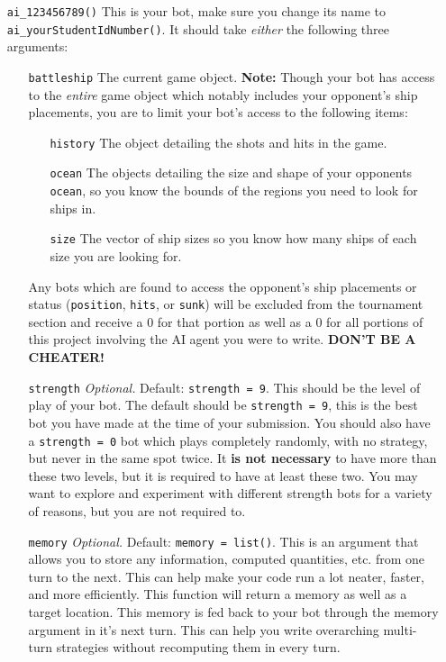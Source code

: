 \documentclass[
]{article}
\begin{document}
\begin{itemize}
\item[\texttt{ai\_123456789()}] This is your bot, make sure you change its name to \texttt{ai\_yourStudentIdNumber()}. It should take \emph{either} the following three arguments:
  \begin{itemize}
      \item[\texttt{battleship}] The current game object. \textbf{Note:} Though your bot has access to the \emph{entire} game object which notably includes your opponent's ship placements, you are to limit your bot's access to the following items:
      \begin{itemize}
        \item[\texttt{history}] The object detailing the shots and hits in the game.
        \item[\texttt{ocean}] The objects detailing the size and shape of your opponents \texttt{ocean}, so you know the bounds of the regions you need to look for ships in.
        \item[\texttt{size}] The vector of ship sizes so you know how many ships of each size you are looking for.
      \end{itemize}
      Any bots which are found to access the opponent's ship placements or status (\texttt{position}, \texttt{hits}, or \texttt{sunk})  will be excluded from the tournament section and receive a \(0\) for that portion as well as a \(0\) for all portions of this project involving the AI agent you were to write. \textbf{DON'T BE A CHEATER!}
      \item[\texttt{strength}] \emph{Optional.} Default: \texttt{strength = 9}. This should be the level of play of your bot. The default should be \texttt{strength = 9}, this is the best bot you have made at the time of your submission. You should also have a \texttt{strength = 0} bot which plays completely randomly, with no strategy, but never in the same spot twice. It \textbf{is not necessary} to have more than these two levels, but it is required to have at least these two. You may want to explore and experiment with different strength bots for a variety of reasons, but you are not required to.
      \item[\texttt{memory}] \emph{Optional.} Default: \texttt{memory = list()}. This is an argument that allows you to store any information, computed quantities, etc. from one turn to the next. This can help make your code run a lot neater, faster, and more efficiently. This function will return a memory as well as a target location. This memory is fed back to your bot through the memory argument in it's next turn. This can help you write overarching multi-turn strategies without recomputing them in every turn.


\end{itemize}
\end{itemize}
\end{document}
